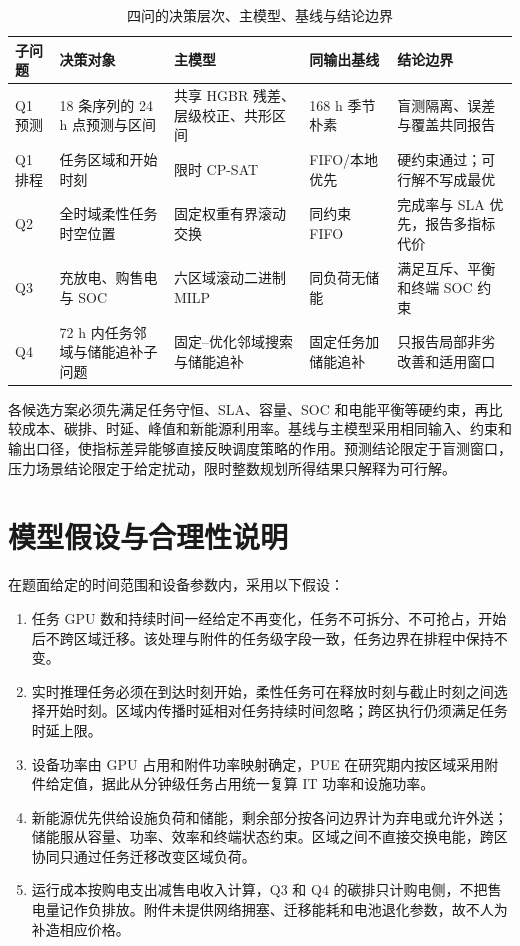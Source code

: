 \begin{table}[H]
  \centering
  \caption{四问的决策层次、主模型、基线与结论边界}
  \label{tab:problem-decomposition}
  \small
  \begin{tabularx}{\textwidth}{p{}p{}p{}p{}X}
    \toprule
    子问题 & 决策对象 & 主模型 & 同输出基线 & 结论边界 \\
    \midrule
    Q1 预测 & 18 条序列的 24 h 点预测与区间 & 共享 HGBR 残差、层级校正、共形区间 & 168 h 季节朴素 & 盲测隔离、误差与覆盖共同报告 \\
    Q1 排程 & 任务区域和开始时刻 & 限时 CP-SAT & FIFO/本地优先 & 硬约束通过；可行解不写成最优 \\
    Q2 & 全时域柔性任务时空位置 & 固定权重有界滚动交换 & 同约束 FIFO & 完成率与 SLA 优先，报告多指标代价 \\
    Q3 & 充放电、购售电与 SOC & 六区域滚动二进制 MILP & 同负荷无储能 & 满足互斥、平衡和终端 SOC 约束 \\
    Q4 & 72 h 内任务邻域与储能追补子问题 & 固定--优化邻域搜索与储能追补 & 固定任务加储能追补 & 只报告局部非劣改善和适用窗口 \\
    \bottomrule
  \end{tabularx}
\end{table}

各候选方案必须先满足任务守恒、SLA、容量、SOC 和电能平衡等硬约束，再比较成本、碳排、时延、峰值和新能源利用率。基线与主模型采用相同输入、约束和输出口径，使指标差异能够直接反映调度策略的作用。预测结论限定于盲测窗口，压力场景结论限定于给定扰动，限时整数规划所得结果只解释为可行解。

\section{模型假设与合理性说明}

在题面给定的时间范围和设备参数内，采用以下假设：

\begin{enumerate}
  \item 任务 GPU 数和持续时间一经给定不再变化，任务不可拆分、不可抢占，开始后不跨区域迁移。该处理与附件的任务级字段一致，任务边界在排程中保持不变。
  \item 实时推理任务必须在到达时刻开始，柔性任务可在释放时刻与截止时刻之间选择开始时刻。区域内传播时延相对任务持续时间忽略；跨区执行仍须满足任务时延上限。
  \item 设备功率由 GPU 占用和附件功率映射确定，PUE 在研究期内按区域采用附件给定值，据此从分钟级任务占用统一复算 IT 功率和设施功率。
  \item 新能源优先供给设施负荷和储能，剩余部分按各问边界计为弃电或允许外送；储能服从容量、功率、效率和终端状态约束。区域之间不直接交换电能，跨区协同只通过任务迁移改变区域负荷。
  \item 运行成本按购电支出减售电收入计算，Q3 和 Q4 的碳排只计购电侧，不把售电量记作负排放。附件未提供网络拥塞、迁移能耗和电池退化参数，故不人为补造相应价格。
\end{enumerate}

